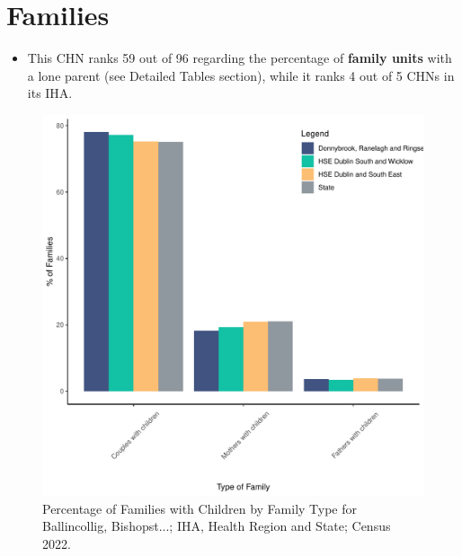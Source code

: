 \documentclass{article}
\begin{document}
\section{Families}\label{sect:Fam}
\begin{itemize}
\item This CHN ranks  59 out of 96 regarding the percentage of \textbf{family units} with a lone parent (see Detailed Tables section), while it ranks   4 out of 5 CHNs in its IHA.
\end{itemize}
\begin{figure}[H]
	\centering
	\includegraphics[width = 150mm]{../figures/FamED.pdf}
	\caption{Percentage of Families with Children by Family Type for Ballincollig, Bishopst...; IHA, Health Region and State; Census 2022.}
	\label{fig:vbnv}
	\end{figure}
	
\end{document}
